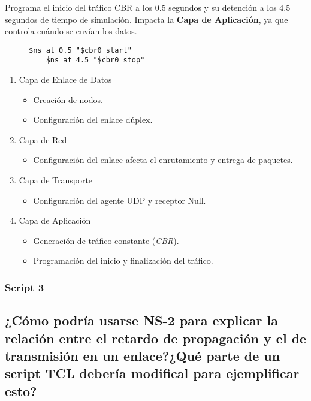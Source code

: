 \noindent Programa el inicio del tr\'afico CBR a los 0.5 segundos y su detenci\'on a los 4.5 segundos de tiempo de simulaci\'on. Impacta la
\textbf{Capa de Aplicaci\'on}, ya que controla cu\'ando se env\'ian los datos.
\begin{figure}[H]
  \begin{lstlisting}[frame=single, breaklines=true, basicstyle=\footnotesize\ttfamily, breakatwhitespace=false, 
    columns=flexible, tabsize=2, showstringspaces=false]
    $ns at 0.5 "$cbr0 start"
    $ns at 4.5 "$cbr0 stop"    
  \end{lstlisting}
\end{figure}

\begin{enumerate}
  \item Capa de Enlace de Datos
  \begin{itemize}
    \item Creaci\'on de nodos.
    \item Configuraci\'on del enlace d\'uplex.
  \end{itemize}

  \item Capa de Red
  \begin{itemize}
    \item Configuraci\'on del enlace afecta el enrutamiento y entrega de paquetes.
  \end{itemize}

  \item Capa de Transporte
  \begin{itemize}
    \item Configuraci\'on del agente UDP y receptor Null.
  \end{itemize}

  \item Capa de Aplicaci\'on
  \begin{itemize}
    \item Generaci\'on de tr\'afico constante (\textit{CBR}).
    \item Programaci\'on del inicio y finalizaci\'on del tr\'afico.
  \end{itemize}
\end{enumerate}

\subsubsection*{Script 3}

\subsection*{¿C\'omo podr\'ia usarse NS-2 para explicar la relaci\'on entre el retardo de propagaci\'on y el de transmisi\'on en un
enlace?¿Qu\'e parte de un script TCL deber\'ia modifical para ejemplificar esto?}

